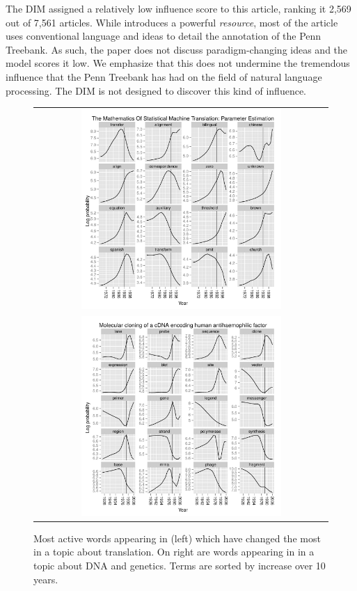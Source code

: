 The DIM assigned a relatively low influence score to this article,
ranking it 2,569 out of 7,561 articles.  While \cite{marcus:1993}  %
introduces a powerful \emph{resource}, most of the article uses
conventional language and ideas to detail the annotation of the Penn
Treebank.  As such, the paper does not discuss paradigm-changing ideas
and the model scores it low.  We emphasize that this does not
undermine the tremendous influence that the Penn Treebank has had on
the field of natural language processing.  The DIM is not designed to
discover this kind of influence.

\begin{figure}
  \center
\normalsize
\begin{tabular}{c}
\includegraphics[width=0.7\textwidth]{chapter_influence/figures/acl_brown.pdf}
\\
\includegraphics[width=0.7\textwidth]{chapter_influence/figures/nature_cloning.pdf} \\
\end{tabular}
  \small
\caption{Most active words appearing in \cite{brown:1993} (left) which
  have changed the most in a topic about translation. On right are
  words appearing in \cite{toole:1984} in a topic about DNA and
  genetics.  Terms are sorted by increase over 10 years.}  \normalsize
\label{fig:words}
\end{figure}

